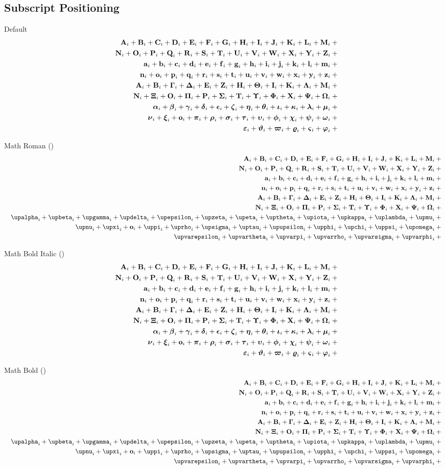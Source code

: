 	\subsection{Subscript Positioning \showfamily}

	Default
	\def\test#1{\mathnormal{#1}_{i}+{}}%
	\begin{eqnarray*}
	  && {\testupperi}\\
	  && {\testupperii}\\
	  && {\testloweri}\\
	  && {\testlowerii}\\
	  && {\testupgreeki}\\
	  && {\testupgreekii}\\
	  && {\testlowgreeki}\\
	  && {\testlowgreekii}\\
	  && {\testlowgreekiii}
	\end{eqnarray*}%

	Math Roman (\texttt{\string\mathrm})
	\def\test#1{\mathrm{#1}_{i}+{}}%
	\begin{eqnarray*}
	  && {\testupperi}\\
	  && {\testupperii}\\
	  && {\testloweri}\\
	  && {\testlowerii}\\
	  && {\testupgreeki}\\
	  && {\testupgreekii}\\
	  && {\testlowgreekupi}\\
	  && {\testlowgreekupii}\\
	  && {\testlowgreekupiii}
	\end{eqnarray*}%

	Math Bold Italic (\texttt{\string\bm})
	\def\test#1{\bm{#1}_{i}+{}}%
	\begin{eqnarray*}
	  && {\testupperi}\\
	  && {\testupperii}\\
	  && {\testloweri}\\
	  && {\testlowerii}\\
	  && {\testupgreeki}\\
	  && {\testupgreekii}\\
	  && {\testlowgreeki}\\
	  && {\testlowgreekii}\\
	  && {\testlowgreekiii}
	\end{eqnarray*}

	Math Bold (\texttt{\string\mathbf})
	\def\test#1{\mathbf{#1}_{i}+{}}%
	\begin{eqnarray*}
	  && {\testupperi}\\
	  && {\testupperii}\\
	  && {\testloweri}\\
	  && {\testlowerii}\\
	  && {\testupgreeki}\\
	  && {\testupgreekii}\\
	  && {\def\test#1{\bm{\mathbf{#1}}_{i}+{}}\testlowgreekupi}\\
	  && {\def\test#1{\bm{\mathbf{#1}}_{i}+{}}\testlowgreekupii}\\
	  && {\def\test#1{\bm{\mathbf{#1}}_{i}+{}}\testlowgreekupiii}
	\end{eqnarray*}%


